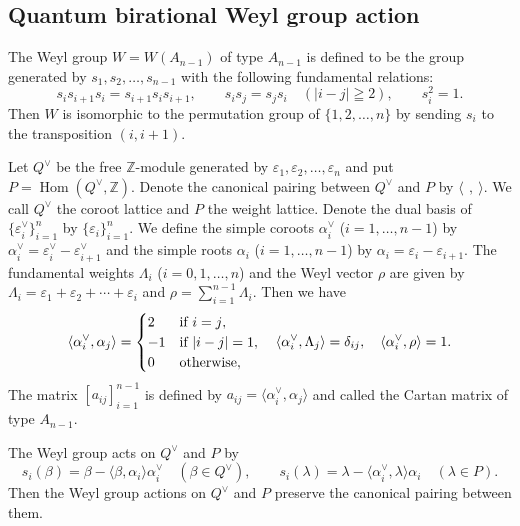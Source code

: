 \documentclass[12pt,twoside]{article}
\newcommand\av{\alpha^\vee}
\newcommand\eps{\varepsilon}
\newcommand\epsv{\eps^\vee}
\newcommand\Qv{Q^\vee}
\newcommand\bra{\langle}
\newcommand\ket{\rangle}
\newcommand\Hom{\mathop{\mathrm{Hom}}\nolimits}
\newcommand\Z{{\mathbb Z}} %
\theoremstyle{plain} %
\theoremstyle{definition} %
\theoremstyle{definition} %
\numberwithin{theorem}{section}
\numberwithin{equation}{section}
\numberwithin{figure}{section}
\numberwithin{table}{section}
\begin{document}
\subsection{Quantum birational Weyl group action}
\label{sec:Weyl-A_{n-1}}

The Weyl group $W=W(A_{n-1})$ of type $A_{n-1}$ is defined to be the group
generated by $s_1,s_2,\ldots,s_{n-1}$ with the following fundamental relations:
\begin{equation}
 s_i s_{i+1}s_i = s_{i+1}s_i s_{i+1}, \qquad
 s_i s_j = s_j s_i \quad (|i-j|\geqq 2), \qquad
 s_i^2 = 1.
 \label{eq:Weyl}
\end{equation}
Then $W$ is isomorphic to the permutation group of $\{1,2,\ldots,n\}$ 
by sending $s_i$ to the transposition $(i,i+1)$.

Let $\Qv$ be the free $\Z$-module generated by $\eps_1,\eps_2,\ldots,\eps_n$
and put $P=\Hom(\Qv,\Z)$.
Denote the canonical pairing between $\Qv$ and $P$ by $\bra\,\ ,\ \ket$.
We call $\Qv$ the coroot lattice and $P$ the weight lattice.
Denote the dual basis of $\{\epsv_i\}_{i=1}^n$ by $\{\eps_i\}_{i=1}^n$.
We define the simple coroots $\av_i$ ($i=1,\ldots,n-1$) by $\av_i=\epsv_i-\epsv_{i+1}$
and the simple roots $\alpha_i$ ($i=1,\ldots,n-1$) by $\alpha_i=\eps_i-\eps_{i+1}$.
The fundamental weights $\Lambda_i$ ($i=0,1,\ldots,n$) 
and the Weyl vector $\rho$ are given by
$\Lambda_i = \eps_1+\eps_2+\cdots+\eps_i$ and $\rho=\sum_{i=1}^{n-1}\Lambda_i$.
Then we have
\begin{equation}
 \bra\av_i,\alpha_j\ket =
 \begin{cases}
   2 & \text{if $i=j$},  \\
  -1 & \text{if $|i-j|=1$}, \\
   0 & \text{otherwise}, \\ 
 \end{cases}
 \quad
 \bra\av_i,\Lambda_j\ket = \delta_{ij},
 \quad
 \bra\av_i,\rho\ket = 1.
 \label{eq:a_{ij}}
\end{equation}
The matrix $[a_{ij}]_{i=1}^{n-1}$ is defined by $a_{ij}=\bra\av_i,\alpha_j\ket$ and
called the Cartan matrix of type $A_{n-1}$.

The Weyl group acts on $\Qv$ and $P$ by
\begin{equation*}
 s_i(\beta) = \beta - \bra\beta,\alpha_i\ket\av_i \quad (\beta\in\Qv), \qquad
 s_i(\lambda) = \lambda - \bra\av_i,\lambda\ket\alpha_i \quad (\lambda\in P).
 \label{eq:Weyl-Q-P}
\end{equation*}
Then the Weyl group actions on $\Qv$ and $P$ preserve the canonical pairing
between them.
 
\end{document}
